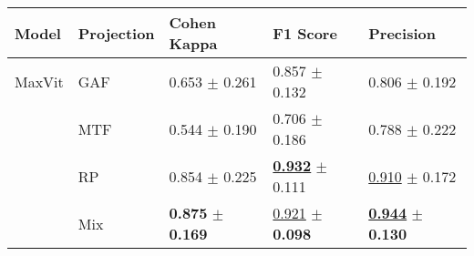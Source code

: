
\begin{tabular}[t]{lllll}
\toprule
Model & Projection & Cohen Kappa & F1 Score & Precision \\
\midrule
MaxVit & GAF & \textcolor[rgb]{0.6722689076,0.3277310924,0}{0.653} $\pm$ \textcolor[rgb]{1.0000000000,0.0000000000,0}{0.261} & \textcolor[rgb]{0.3311979500,0.5000000000,0}{0.857} $\pm$ \textcolor[rgb]{0.3783309468,0.5000000000,0}{0.132} & \textcolor[rgb]{0.8870967742,0.1129032258,0}{0.806} $\pm$ \textcolor[rgb]{0.6824753509,0.3175246491,0}{0.192} \\
 & MTF & \textcolor[rgb]{1.0000000000,0.0000000000,0}{0.544} $\pm$ \textcolor[rgb]{0.2378574494,0.5000000000,0}{0.190} & \textcolor[rgb]{1.0000000000,0.0000000000,0}{0.706} $\pm$ \textcolor[rgb]{1.0000000000,0.0000000000,0}{0.186} & \textcolor[rgb]{1.0000000000,0.0000000000,0}{0.788} $\pm$ \textcolor[rgb]{1.0000000000,0.0000000000,0}{0.222} \\
 & RP & \textcolor[rgb]{0.0630252101,0.5000000000,0}{0.854} $\pm$ \textcolor[rgb]{0.6134136341,0.3865863659,0}{0.225} & \underline{\textbf{\textcolor[rgb]{0.0000000000,0.5000000000,0}{0.932}}} $\pm$ \textcolor[rgb]{0.1465115097,0.5000000000,0}{0.111} & \underline{\textcolor[rgb]{0.2217741935,0.5000000000,0}{0.910}} $\pm$ \textcolor[rgb]{0.4609922199,0.5000000000,0}{0.172} \\
 & Mix & \textbf{\textcolor[rgb]{0.0000000000,0.5000000000,0}{0.875}} $\pm$ \textbf{\textcolor[rgb]{0.0000000000,0.5000000000,0}{0.169}} & \underline{\textcolor[rgb]{0.0458039718,0.5000000000,0}{0.921}} $\pm$ \textbf{\textcolor[rgb]{0.0000000000,0.5000000000,0}{0.098}} & \underline{\textbf{\textcolor[rgb]{0.0000000000,0.5000000000,0}{0.944}}} $\pm$ \textbf{\textcolor[rgb]{0.0000000000,0.5000000000,0}{0.130}} \\
\bottomrule
\end{tabular}

